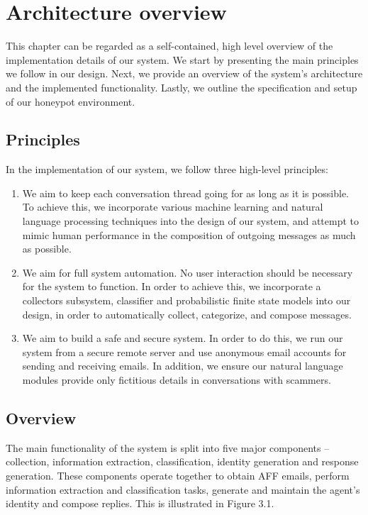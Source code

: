 \chapter{Architecture overview}
This chapter can be regarded as a self-contained, high level overview of the implementation details of our system. We start by presenting the main principles we follow in our design. Next, we provide an overview of the system's architecture and the implemented functionality. Lastly, we outline the specification and setup of our honeypot environment.

\section{Principles}
In the implementation of our system, we follow three high-level principles:

\begin{enumerate}
\item We aim to keep each conversation thread going for as long as it is possible. To achieve this, we incorporate various machine learning and natural language processing techniques into the design of our system, and attempt to mimic human performance in the composition of outgoing messages as much as possible.
\item We aim for full system automation. No user interaction should be necessary for the system to function. In order to achieve this, we incorporate a collectors subsystem, classifier and probabilistic finite state models into our design, in order to automatically collect, categorize, and compose messages.
\item We aim to build a safe and secure system. In order to do this, we run our system from a secure remote server and use anonymous email accounts for sending and receiving emails. In addition, we ensure our natural language modules provide only fictitious details in conversations with scammers.
\end{enumerate}

\section{Overview}
The main functionality of the system is split into five major components -- collection, information extraction, classification, identity generation and response generation. These components operate together to obtain AFF emails, perform information extraction and classification tasks, generate and maintain the agent's identity and compose replies. This is illustrated in Figure 3.1.

